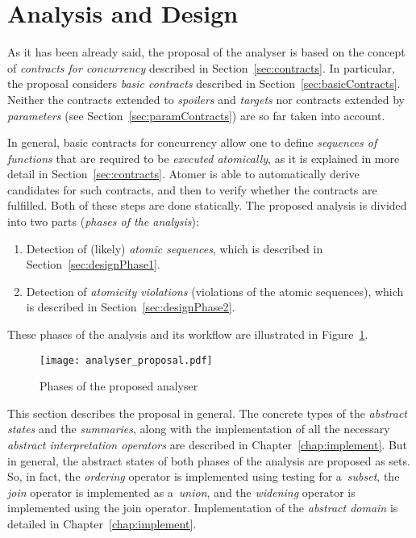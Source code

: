 \section{Analysis and Design}
\label{sec:design}

As it has been already said, the proposal of the analyser is based on 
the concept of \emph{contracts for concurrency} described in
Section~\ref{sec:contracts}. In particular, the proposal considers 
\emph{basic contracts} described in Section~\ref{sec:basicContracts}.
Neither the contracts extended to \emph{spoilers} and \emph{targets} 
nor contracts extended by \emph{parameters} (see
Section~\ref{sec:paramContracts}) are so far taken into account.

In general, basic contracts for concurrency allow one to define
\emph{sequences of functions} that are required to be \emph{executed
atomically}, as it is explained in more detail in Section~\ref{sec:contracts}.
Atomer is able to automatically derive candidates for such contracts, and
then to verify whether the contracts are fulfilled. Both of these steps
are done statically. The proposed analysis is divided into two parts
(\emph{phases of the analysis}):
\begin{enumerate}[label={\textbf{Phase \arabic*}:}, leftmargin=6em]
    \item
        Detection of (likely) \emph{atomic sequences}, which is described 
        in Section~\ref{sec:designPhase1}.

    \item
        Detection of \emph{atomicity violations} (violations of the atomic
        sequences), which is described in Section~\ref{sec:designPhase2}.
\end{enumerate}
These phases of the analysis and its workflow are illustrated in
Figure~\ref{fig:analyserPhases}.

\begin{figure}[hbt]
    \centering
    \texttt{[image: analyser\_proposal.pdf]}
    \caption{Phases of the proposed analyser}
    \label{fig:analyserPhases}
\end{figure}

This section describes the proposal in general. The concrete types
of the \emph{abstract states} and the \emph{summaries}, along with the
implementation of all the necessary \emph{abstract interpretation 
operators} are described in Chapter~\ref{chap:implement}. But
in general, the abstract states of both phases of the analysis
are proposed as sets. So, in fact, the \emph{ordering} operator
is implemented using testing for a~\emph{subset}, the \emph{join}
operator is implemented as a~\emph{union}, and the \emph{widening}
operator is implemented using the join operator. Implementation of the
\emph{abstract domain} is detailed in Chapter~\ref{chap:implement}.

